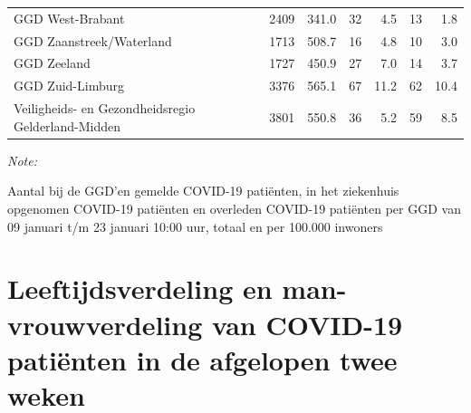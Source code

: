\documentclass[
  english,
  man,floatsintext]{apa6}
\begin{document}
\begin{table}[H]
\begin{threeparttable}
\begin{tabular}{lrrrrrr}
GGD West-Brabant & 2409 & 341.0 & 32 & 4.5 & 13 & 1.8\\
GGD Zaanstreek/Waterland & 1713 & 508.7 & 16 & 4.8 & 10 & 3.0\\
GGD Zeeland & 1727 & 450.9 & 27 & 7.0 & 14 & 3.7\\
GGD Zuid-Limburg & 3376 & 565.1 & 67 & 11.2 & 62 & 10.4\\
Veiligheids- en Gezondheidsregio Gelderland-Midden & 3801 & 550.8 & 36 & 5.2 & 59 & 8.5\\
\bottomrule
\end{tabular}
\begin{tablenotes}
\item \textit{Note: } 
\item Aantal bij de GGD’en gemelde COVID-19 patiënten, in het ziekenhuis opgenomen COVID-19 patiënten en overleden COVID-19 patiënten per GGD van 09 januari t/m 23 januari 10:00 uur, totaal en per 100.000 inwoners
\end{tablenotes}
\end{threeparttable}
\endgroup{}
\end{table}

\newpage

\hypertarget{leeftijdsverdeling-en-man-vrouwverdeling-van-covid-19-patiuxebnten-in-de-afgelopen-twee-weken}{%
\section{Leeftijdsverdeling en man-vrouwverdeling van COVID-19 patiënten in de afgelopen twee weken}\label{leeftijdsverdeling-en-man-vrouwverdeling-van-covid-19-patiuxebnten-in-de-afgelopen-twee-weken}}
\end{document}
